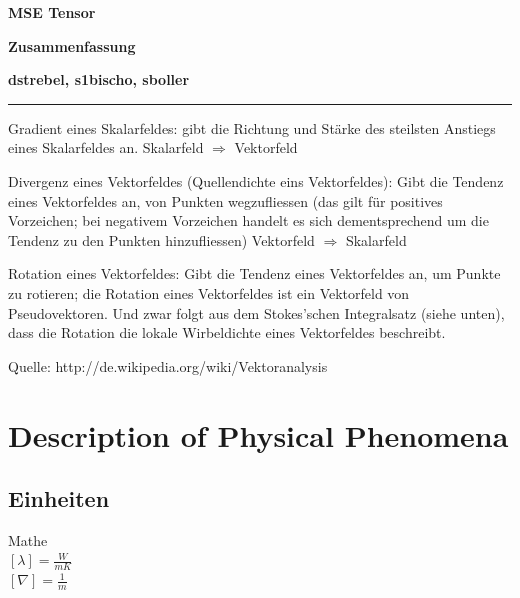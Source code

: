 \documentclass[a4paper]{scrartcl}
\begin{document}
\pagestyle{fancy}
\fancyhf{} 
\fancyfoot[C]{\thepage} %
\renewcommand{\headrulewidth}{0pt}
\renewcommand{\footrulewidth}{0.5pt}

 \centerline{\LARGE \bf \textsf{MSE Tensor}} 
 \smallskip
\centerline{\Large \bf \textsf {Zusammenfassung}}
\medskip
  \centerline{\bf \textsf{dstrebel, s1bischo, sboller }}

 \smallskip \noindent\rule{\textwidth}{0.5pt}
\smallskip%




Gradient eines Skalarfeldes: gibt die Richtung und Stärke des steilsten Anstiegs
eines Skalarfeldes an.
Skalarfeld $\Rightarrow$ Vektorfeld

Divergenz eines Vektorfeldes (Quellendichte eins Vektorfeldes): Gibt die Tendenz
eines Vektorfeldes an, von Punkten wegzufliessen (das gilt für positives
Vorzeichen; bei negativem Vorzeichen handelt es sich dementsprechend um die
Tendenz zu den Punkten hinzufliessen) Vektorfeld $\Rightarrow$ Skalarfeld

Rotation eines Vektorfeldes: Gibt die Tendenz eines Vektorfeldes an, um Punkte
zu rotieren; die Rotation eines Vektorfeldes ist ein Vektorfeld von
Pseudovektoren. Und zwar folgt aus dem Stokes’schen Integralsatz (siehe unten),
dass die Rotation die lokale Wirbeldichte eines Vektorfeldes beschreibt.

Quelle: http://de.wikipedia.org/wiki/Vektoranalysis\\

\newpage
\tableofcontents

\newpage

\section{Description of Physical Phenomena}
\subsection{Einheiten}

Mathe\\
$ [\lambda]=\frac{W}{mK} $\\
$ [\nabla]=\frac{1}{m} $\\
\end{document}
